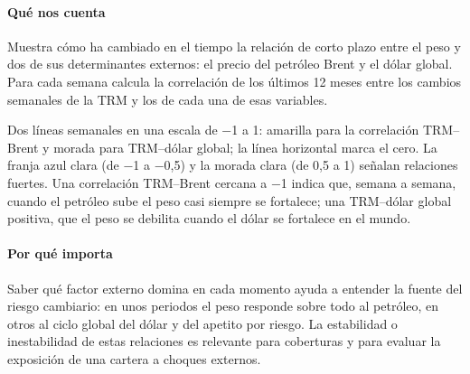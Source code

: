 \paragraph{Qué nos cuenta}
Muestra cómo ha cambiado en el tiempo la relación de corto plazo entre el peso y dos de sus determinantes externos: el precio del petróleo Brent y el dólar global. Para cada semana calcula la correlación de los últimos 12 meses entre los cambios semanales de la TRM y los de cada una de esas variables.

\begin{leer}
Dos líneas semanales en una escala de −1 a 1: amarilla para la correlación TRM–Brent y morada para TRM–dólar global; la línea horizontal marca el cero. La franja azul clara (de −1 a −0,5) y la morada clara (de 0,5 a 1) señalan relaciones fuertes. Una correlación TRM–Brent cercana a −1 indica que, semana a semana, cuando el petróleo sube el peso casi siempre se fortalece; una TRM–dólar global positiva, que el peso se debilita cuando el dólar se fortalece en el mundo.
\end{leer}

\paragraph{Por qué importa}
Saber qué factor externo domina en cada momento ayuda a entender la fuente del riesgo cambiario: en unos periodos el peso responde sobre todo al petróleo, en otros al ciclo global del dólar y del apetito por riesgo. La estabilidad o inestabilidad de estas relaciones es relevante para coberturas y para evaluar la exposición de una cartera a choques externos.

